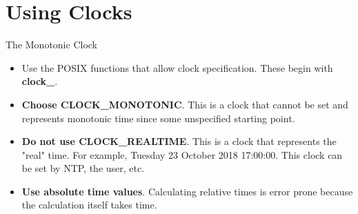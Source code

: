 \section{Using Clocks}

\begin{frame}
   {The Monotonic Clock}

   \begin{itemize}
      \item
      Use the POSIX functions that allow clock specification. These
      begin with \textbf{clock\_}.
      \item
      \textbf{Choose CLOCK\_MONOTONIC}. This is a clock that cannot be
      set and represents monotonic time since some unspecified starting
      point.
      \item
      \textbf{Do not use CLOCK\_REALTIME}. This is a clock that represents
      the "real" time. For example, Tuesday 23 October 2018 17:00:00.
      This clock can be set by NTP, the user, etc.
      \item
      \textbf{Use absolute time values}. Calculating relative times is error prone
      because the calculation itself takes time.
   \end{itemize}

\end{frame}

\cprotect{}
